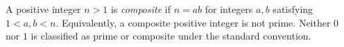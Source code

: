 
A positive integer $n>1$ is \emph{composite} if $n=ab$ for integers $a,b$ satisfying $1<a,b<n$. Equivalently, a composite positive integer is not prime. Neither $0$ nor $1$ is classified as prime or composite under the standard convention.
